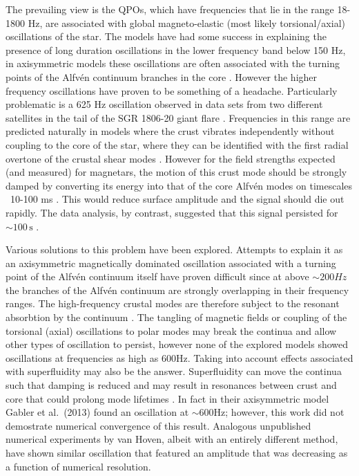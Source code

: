 \documentclass{emulateapj}
\begin{document}
The prevailing view is the QPOs, which have frequencies that lie in the range 18-1800 Hz, are associated with global magneto-elastic (most likely torsional/axial) oscillations of the star. The models have had some success in explaining the presence of long duration oscillations in the lower frequency band below 150 Hz, in axisymmetric models these oscillations are often associated with the turning points of the Alfv\'en continuum branches in the core \citep{Levin07}. However the higher frequency oscillations have proven to be something of a headache. Particularly problematic is a 625 Hz oscillation observed in data sets from two different satellites in the tail of the SGR 1806-20 giant flare \citep{Watts06, Strohmayer06}.  Frequencies in this range are predicted naturally in models where the crust vibrates independently without coupling to the core of the star, where they can be identified with the first radial overtone of the crustal shear modes \citep{Piro05}.  However for the field strengths expected (and measured) for magnetars, the motion of this crust mode should be strongly damped by converting its energy into that of the core Alfv\'en modes on timescales ~10-100 ms \citep{Levin06,vanHoven11,Colaiuda11,Gabler12}. This would reduce surface amplitude and the signal should die out rapidly. The data analysis, by contrast, suggested that this signal persisted for $\sim100 \, \mathrm{s}$ \citep{Strohmayer06}.

Various solutions to this problem have been explored. Attempts to explain it as an axisymmetric magnetically dominated oscillation associated with a turning point of the Alfv\'en continuum itself have proven difficult since at above $\sim 200Hz$ the branches of the Alfv\'en continuum are strongly overlapping in their frequency ranges.  The high-frequency crustal modes are therefore subject to the resonant absorbtion by the continuum \citep{vanHoven11, vanHoven12}. The tangling of magnetic fields \citep{vanHoven11}  or coupling of the torsional (axial) oscillations to polar modes \citep{Colaiuda12,Lander10,Lander11} may break the continua and allow other types of oscillation to persist,
however none of the explored models showed oscillations at frequencies as high as $600$Hz. Taking into account effects associated with superfluidity may also be the answer. Superfluidity can move the continua such that damping is reduced \citep{vanHoven08, Andersson09, Passamonti13a} and may result in resonances between crust and core that could prolong mode lifetimes \citep{Gabler13, Passamonti13b}.  In fact in their axisymmetric model Gabler et al.~(2013) found an oscillation at $\sim 600$Hz; however, this work
did not demostrate  numerical convergence of this result. Analogous unpublished numerical experiments
by van Hoven, albeit with an entirely different method, have shown similar oscillation that featured an amplitude that was decreasing as a function of numerical resolution.
\end{document}
